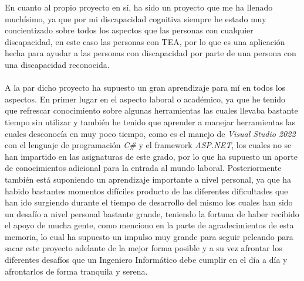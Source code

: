 En cuanto al propio proyecto en sí, ha sido un proyecto que me ha llenado
muchísimo, ya que por mi discapacidad cognitiva siempre he estado muy
concientizado sobre todos los aspectos que las personas con cualquier
discapacidad, en este caso las personas con TEA, por lo que es una aplicación
hecha para ayudar a las personas con discapacidad por parte de una persona con
una discapacidad reconocida.\\
\\
A la par dicho proyecto ha supuesto un gran aprendizaje para mí en todos los
aspectos. En primer lugar en el aspecto laboral o académico, ya que he tenido
que refrescar conocimiento sobre algunas herramientas las cuales llevaba
bastante tiempo sin utilizar y también he tenido que aprender a manejar
herramientas las cuales desconocía en muy poco tiempo, como es el manejo de
\textit{Visual Studio 2022} con el lenguaje de programación \textit{C\#} y el
framework \textit{ASP.NET}, los cuales no se han impartido en las asignaturas de
este grado, por lo que ha supuesto un aporte de conocimientos adicional para la
entrada al mundo laboral. Posteriormente también está suponiendo un aprendizaje
importante a nivel personal, ya que ha habido bastantes momentos difíciles
producto de las diferentes dificultades que han ido surgiendo durante el tiempo
de desarrollo del mismo los cuales han sido un desafío a nivel personal bastante
grande, teniendo la fortuna de haber recibido el apoyo de mucha gente, como
menciono en la parte de agradecimientos de esta memoria, lo cual ha supuesto un
impulso muy grande para seguir peleando para sacar este proyecto adelante de la
mejor forma posible y a su vez afrontar los diferentes desafíos que un Ingeniero
Informático debe cumplir en el día a día y afrontarlos de forma tranquila y
serena.
